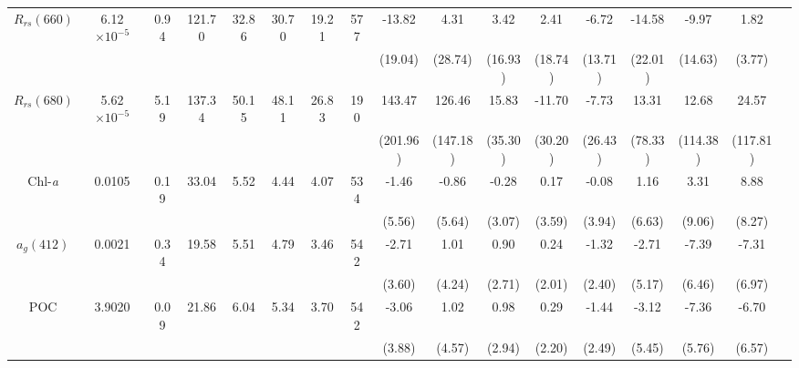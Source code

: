 \documentclass[preview]{standalone}
\begin{document}
\begin{tabular}{ccccccccccccccccc}
$R_{rs}(660)$ 	& 6.12$\times10^{-5}$ 	& 0.94 	& 121.70 	& 32.86 & 30.70 & 19.21 & 577  	& -13.82  	&  4.31 	&  3.42  	&  2.41   	& -6.72  	& -14.58 	& -9.97   	&  1.82  	\\
 				&						&		&			&		&		&		&		& (19.04) 	& (28.74) 	& (16.93) 	& (18.74) 	& (13.71) 	& (22.01) 	& (14.63) 	&  (3.77) 	\\ \hline 
$R_{rs}(680)$ 	& 5.62$\times10^{-5}$ 	& 5.19 	& 137.34 	& 50.15 & 48.11 & 26.83 & 190  	& 143.47  	&126.46 	& 15.83  	&-11.70   	& -7.73  	& 13.31  	& 12.68   	& 24.57  	\\
 				&						&		&			&		&		&		&		& (201.96) 	& (147.18) 	&  (35.30)	&  (30.20)  &  (26.43)	&  (78.33)	& (114.38) 	& (117.81) 	\\ \hline
Chl-\it{a} 		&  0.0105             	& 0.19 	&  33.04  	&  5.52 &  4.44 &  4.07 & 534  	& -1.46  	&   -0.86  	&   -0.28  	&    0.17  	&   -0.08  	&    1.16  	&    3.31  	&    8.88  	\\
 				&						&		&			&		&		&		&		& (5.56) 	& (5.64) 	& (3.07) 	& (3.59) 	& (3.94) 	& (6.63) 	& (9.06) 	& (8.27) 	\\ \hline
$a_{g}(412)$ 	&  0.0021             	& 0.34 	&  19.58  	&  5.51 &  4.79 &  3.46 & 542  	& -2.71  	&    1.01  	&    0.90  	&    0.24  	&   -1.32  	&   -2.71  	&   -7.39  	&   -7.31  	\\
 				&						&		&			&		&		&		&		& (3.60) 	& (4.24) 	& (2.71) 	& (2.01) 	& (2.40) 	& (5.17) 	& (6.46) 	& (6.97) 	\\ \hline
POC 			&  3.9020             	& 0.09 	&  21.86  	&  6.04 &  5.34 &  3.70 & 542  	& -3.06  	&    1.02  	&    0.98  	&    0.29  	&   -1.44  	&   -3.12  	&   -7.36  	&   -6.70  	\\
 				&						&		&			&		&		&		&		& (3.88) 	& (4.57) 	& (2.94) 	& (2.20) 	& (2.49) 	& (5.45) 	& (5.76) 	& (6.57) 	\\ \hline
 \end{tabular}
\end{document}
